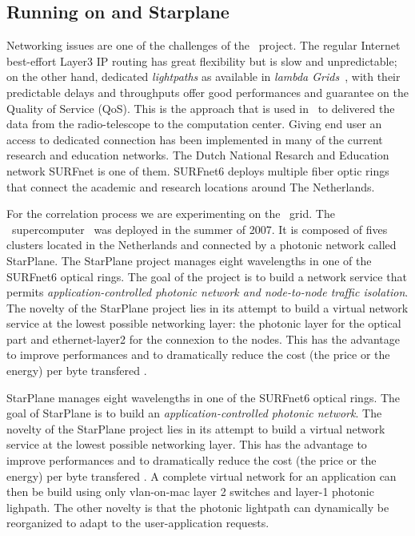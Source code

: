 \subsection{Running \scarie on  and Starplane}
Networking issues are one of the challenges of the \scarie\ project.
The regular Internet best-effort Layer3 IP routing has great
flexibility but is slow and unpredictable; on the other hand,
dedicated \textit{lightpaths} as available in \textit{lambda
  Grids}~\cite{eslea-2007}, with their predictable delays and
throughputs offer good performances and guarantee on the Quality of
Service (QoS). This is the approach that is used in \scarie\ to
delivered the data from the radio-telescope to the computation center.
Giving end user an access to dedicated connection has been implemented
in many of the current research and education networks. The Dutch
National Resarch and Education network SURFnet is one of them.
SURFnet6 deploys multiple fiber optic rings that connect the academic
and research locations around The Netherlands.

For the correlation process we are experimenting on the \ grid.
The \ supercomputer~\cite{das3} was deployed in the summer of
2007. It is composed of fives clusters located in the Netherlands and
connected by a photonic network called StarPlane. The StarPlane
project manages eight wavelengths in one of the SURFnet6 optical
rings.  The goal of the project is to build a network service that
permits \textit{application-controlled photonic network and
  node-to-node traffic isolation}. The novelty of the StarPlane
project lies in its attempt to build a virtual network service at the
lowest possible networking layer: the photonic layer for the optical
part and ethernet-layer2 for the connexion to the nodes. This has the
advantage to improve performances and to dramatically reduce the cost
(the price or the energy) per byte transfered \cite{}.

StarPlane manages eight wavelengths in one of the SURFnet6 optical
rings. The goal of StarPlane is to build an
\textit{application-controlled photonic network}. The novelty of the
StarPlane project lies in its attempt to build a virtual network
service at the lowest possible networking layer. This has the
advantage to improve performances and to dramatically reduce the cost
(the price or the energy) per byte transfered \cite{}.
A complete virtual network for an application can then be build using
only vlan-on-mac layer 2 switches and layer-1 photonic lighpath. The
other novelty is that the photonic lightpath can dynamically be
reorganized to adapt to the user-application requests.  

